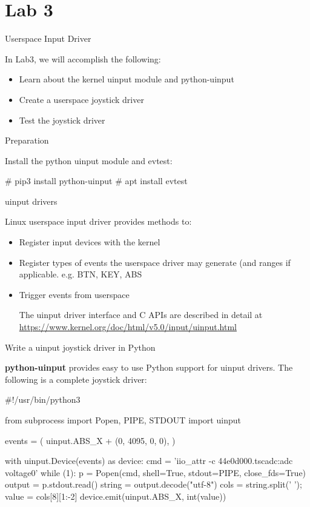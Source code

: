 \section{Lab 3}

\begin{frame}
   {Userspace Input Driver}

   In Lab3, we will accomplish the following:
	\begin{itemize}
		\item
			Learn about the kernel uinput module and python-uinput
		\item
			Create a userspace joystick driver
		\item
			Test the joystick driver
	\end{itemize}
\end{frame}

\begin{frame}
   {Preparation}

	Install the python uinput module and evtest:

	\begin{rawscriptsize}
	# pip3 install python-uinput
	# apt install evtest
	\end{rawscriptsize}
\end{frame}

\begin{frame}
    {uinput drivers}

	Linux userspace input driver provides methods to:
\begin{itemize}
	\item
		Register input devices with the kernel
	\item
		Register types of events the userspace driver may generate (and ranges if applicable. e.g. BTN, KEY, ABS
	\item
		Trigger events from userspace

	The uinput driver interface and C APIs are described in detail at \url{https://www.kernel.org/doc/html/v5.0/input/uinput.html}
\end{itemize}
\end{frame}

\begin{frame}
    {Write a uinput joystick driver in Python}

	\textbf{python-uinput} provides easy to use Python support for uinput drivers. The following is a complete joystick driver:

	\begin{rawscriptsize}
#!/usr/bin/python3

from subprocess import Popen, PIPE, STDOUT
import uinput

events = (
        uinput.ABS_X + (0, 4095, 0, 0),
        )

with uinput.Device(events) as device:
    cmd = 'iio_attr -c 44e0d000.tscadc:adc voltage0'
    while (1):
        p = Popen(cmd, shell=True, stdout=PIPE, close_fds=True)
        output = p.stdout.read()
        string = output.decode("utf-8")
        cols = string.split(' ');
        value = cols[8][1:-2]
        device.emit(uinput.ABS_X, int(value))
	\end{rawscriptsize}
\end{frame}


